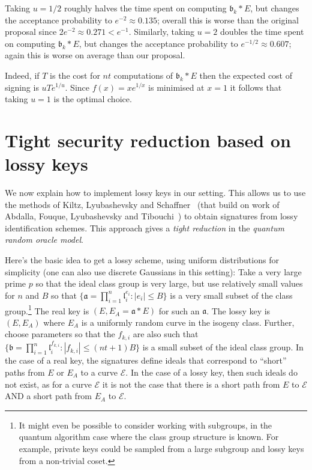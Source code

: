 \documentclass{llncs}
\newcommand{\E}{\mathcal{E}}
\renewcommand{\a}{\mathfrak{a}}
\renewcommand{\b}{\mathfrak{b}}
\renewcommand{\l}{\mathfrak{l}}
\begin{document}
{\begin{enumerate}
Taking $u = 1/2$ roughly halves the time spent on computing $\b_k * E$, but changes the acceptance probability to $e^{-2}  \approx 0.135$; overall this is worse than the original proposal since $2 e^{-2} \approx 0.271 < e^{-1}$.
Similarly, taking $u = 2$ doubles the time spent on computing $\b_k * E$, but changes the acceptance probability to $e^{-1/2} \approx 0.607$; again this is worse on average than our proposal.

Indeed, if $T$ is the cost for $nt$ computations of $\b_k * E$ then the expected cost of signing is $u T e^{1/u}$. Since $f(x) = x e^{1/x}$ is minimised at $x=1$ it follows that taking $u=1$ is the optimal choice.

\end{enumerate}

}  %


\section{Tight security reduction based on lossy keys}\label{sec:lossy-keys}


We now explain how to implement lossy keys in our setting.
This allows us to use the methods of Kiltz, Lyubashevsky and Schaffner~\cite{KLS18} (that build on work of Abdalla, Fouque, Lyubashevsky and Tibouchi~\cite{AFLT12}) to obtain signatures from lossy identification schemes. This approach gives a \emph{tight reduction} in the \emph{quantum random oracle model}.


Here's the basic idea to get a lossy scheme, using uniform distributions for simplicity (one can also use discrete Gaussians in this setting):
Take a very large prime $p$ so that the ideal class group is very large, but use relatively small values for $n$ and $B$ so that $\{ \a = \prod_{i=1}^n \l_i^{e_i} : |e_i| \le B \}$ is a very small subset of the class group.\footnote{It might even be possible to consider working with subgroups, in the quantum algorithm case where the class group structure is known. For example, private keys could be sampled from a large subgroup and lossy keys from a non-trivial coset.}
The real key is $(E, E_A = \a*E )$ for such an $\a$.
The lossy key is $(E, E_A )$ where $E_A$ is a uniformly random curve in the isogeny class.
Further, choose parameters so that the $f_{k,i}$ are also such that $\{ \b = \prod_{i=1}^n \l_i^{f_{k,i}} : |f_{k,i}| \le (nt+1)B \}$ is a small subset of the ideal class group.
In the case of a real key, the signatures define ideals that correspond to ``short'' paths from $E$ or $E_A$ to a  curve $\E$.
In the case of a lossy key, then such ideals do not exist, as for a curve $\E$ it is not the case that there is a short path from $E$ to $\E$ AND a short path from $E_A$ to $\E$.
\end{document}
